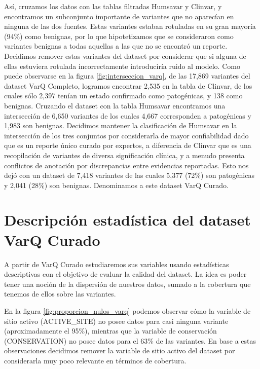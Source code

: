 Así, cruzamos los datos con las tablas filtradas Humsavar y Clinvar, y encontramos un subconjunto importante de variantes que no aparecían en ninguna de las dos fuentes. Estas variantes estaban rotuladas en su gran mayoría (94\%) como benignas, por lo que hipotetizamos que se consideraron como variantes benignas a todas aquellas a las que no se encontró un reporte. Decidimos remover estas variantes del dataset por considerar que si alguna de ellas estuviera rotulada incorrectamente introduciría ruido al modelo. Como puede observarse en la figura \ref{fig:interseccion_varq}, de las 17,869 variantes del dataset VarQ Completo, logramos encontrar 2,535 en la tabla de Clinvar, de los cuales sólo 2,397 tenían un estado confirmado como patogénicas, y 138 como benignas. Cruzando el dataset con la tabla Humsavar encontramos una intersección de 6,650 variantes de los cuales 4,667 corresponden a patogénicas y 1,983 son benignas. Decidimos mantener la clasificación de Humsavar en la intersección de los tres conjuntos por considerarla de mayor confiabilidad dado que es un reporte único curado por expertos, a diferencia de Clinvar que es una recopilación de variantes de diversa significación clínica, y a menudo presenta conflictos de anotación por discrepancias entre evidencias reportadas. Esto nos dejó con un dataset de 7,418 variantes de las cuales 5,377 (72\%) son patogénicas y 2,041 (28\%) son benignas. Denominamos a este dataset VarQ Curado. 


\section{Descripción estadística del dataset VarQ Curado}

A partir de VarQ Curado estudiaremos sus variables usando estadísticas descriptivas con el objetivo de evaluar la calidad del dataset. La idea es poder tener una noción de la dispersión de nuestros datos, sumado a la cobertura que tenemos de ellos sobre las variantes.

En la figura \ref{fig:proporcion_nulos_varq} podemos observar cómo la variable de sitio activo (ACTIVE\_SITE) no posee datos para casi ninguna variante (aproximadamente el 95\%), mientras que la variable de conservación (CONSERVATION) no posee datos para el 63\% de las variantes. En base a estas observaciones decidimos remover la variable de sitio activo del dataset por considerarla muy poco relevante en términos de cobertura.

